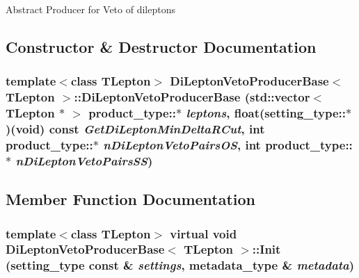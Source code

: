 Abstract Producer for Veto of dileptons 

\subsection{Constructor \& Destructor Documentation}
\hypertarget{classDiLeptonVetoProducerBase_a7d2ee9e3c268259e5f754e78555d9e2b}{
\subsubsection[{DiLeptonVetoProducerBase}]{\setlength{\rightskip}{0pt plus 5cm}template$<$class TLepton$>$ {\bf DiLeptonVetoProducerBase}$<$ TLepton $>$::{\bf DiLeptonVetoProducerBase} (std::vector$<$ TLepton $\ast$ $>$ product\_\-type::$\ast$ {\em leptons}, \/  float(setting\_\-type::$\ast$)(void) const  {\em GetDiLeptonMinDeltaRCut}, \/  int product\_\-type::$\ast$ {\em nDiLeptonVetoPairsOS}, \/  int product\_\-type::$\ast$ {\em nDiLeptonVetoPairsSS})}}
\label{classDiLeptonVetoProducerBase_a7d2ee9e3c268259e5f754e78555d9e2b}


\subsection{Member Function Documentation}
\hypertarget{classDiLeptonVetoProducerBase_a759df02383c27e660029ce98bdac99ca}{
\subsubsection[{Init}]{\setlength{\rightskip}{0pt plus 5cm}template$<$class TLepton$>$ virtual void {\bf DiLeptonVetoProducerBase}$<$ TLepton $>$::Init (setting\_\-type const \& {\em settings}, \/  metadata\_\-type \& {\em metadata})}}
\label{classDiLeptonVetoProducerBase_a759df02383c27e660029ce98bdac99ca}


